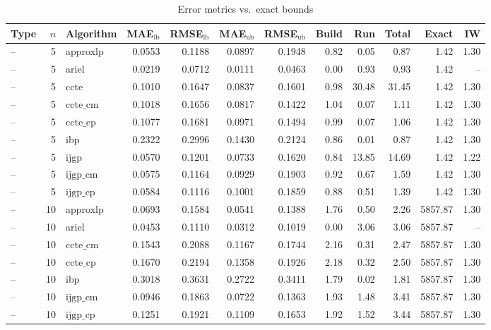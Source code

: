 \begin{table}[ht]
\centering
\scriptsize
\caption{Error metrics vs.\ exact bounds}
\begin{tabular}{lrlrrrrrrrrr}
\toprule
Type & $n$ & Algorithm & MAE$_{\text{lb}}$ & RMSE$_{\text{lb}}$ & MAE$_{\text{ub}}$ & RMSE$_{\text{ub}}$ & Build & Run & Total & Exact & IW \\
\midrule
-- & 5 & approxlp & 0.0553 & 0.1188 & 0.0897 & 0.1948 & 0.82 & 0.05 & 0.87 & 1.42 & 1.30 \\
-- & 5 & ariel & 0.0219 & 0.0712 & 0.0111 & 0.0463 & 0.00 & 0.93 & 0.93 & 1.42 & -- \\
-- & 5 & ccte & 0.1010 & 0.1647 & 0.0837 & 0.1601 & 0.98 & 30.48 & 31.45 & 1.42 & 1.30 \\
-- & 5 & $\text{ccte\_cm}$ & 0.1018 & 0.1656 & 0.0817 & 0.1422 & 1.04 & 0.07 & 1.11 & 1.42 & 1.30 \\
-- & 5 & $\text{ccte\_cp}$ & 0.1077 & 0.1681 & 0.0971 & 0.1494 & 0.99 & 0.07 & 1.06 & 1.42 & 1.30 \\
-- & 5 & ibp & 0.2322 & 0.2996 & 0.1430 & 0.2124 & 0.86 & 0.01 & 0.87 & 1.42 & 1.30 \\
-- & 5 & ijgp & 0.0570 & 0.1201 & 0.0733 & 0.1620 & 0.84 & 13.85 & 14.69 & 1.42 & 1.22 \\
-- & 5 & $\text{ijgp\_cm}$ & 0.0575 & 0.1164 & 0.0929 & 0.1903 & 0.92 & 0.67 & 1.59 & 1.42 & 1.30 \\
-- & 5 & $\text{ijgp\_cp}$ & 0.0584 & 0.1116 & 0.1001 & 0.1859 & 0.88 & 0.51 & 1.39 & 1.42 & 1.30 \\
-- & 10 & approxlp & 0.0693 & 0.1584 & 0.0541 & 0.1388 & 1.76 & 0.50 & 2.26 & 5857.87 & 1.30 \\
-- & 10 & ariel & 0.0453 & 0.1110 & 0.0312 & 0.1019 & 0.00 & 3.06 & 3.06 & 5857.87 & -- \\
-- & 10 & $\text{ccte\_cm}$ & 0.1543 & 0.2088 & 0.1167 & 0.1744 & 2.16 & 0.31 & 2.47 & 5857.87 & 1.30 \\
-- & 10 & $\text{ccte\_cp}$ & 0.1670 & 0.2194 & 0.1358 & 0.1926 & 2.18 & 0.32 & 2.50 & 5857.87 & 1.30 \\
-- & 10 & ibp & 0.3018 & 0.3631 & 0.2722 & 0.3411 & 1.79 & 0.02 & 1.81 & 5857.87 & 1.30 \\
-- & 10 & $\text{ijgp\_cm}$ & 0.0946 & 0.1863 & 0.0722 & 0.1363 & 1.93 & 1.48 & 3.41 & 5857.87 & 1.30 \\
-- & 10 & $\text{ijgp\_cp}$ & 0.1251 & 0.1921 & 0.1109 & 0.1653 & 1.92 & 1.52 & 3.44 & 5857.87 & 1.30 \\
\bottomrule
\end{tabular}
\end{table}
